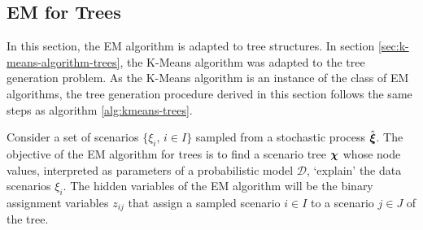 \subsection{EM for Trees}
\label{sec:mixt-gauss-trees}
In this section, the EM algorithm is adapted to tree structures.
In section \ref{sec:k-means-algorithm-trees}, the K-Means algorithm was adapted to the tree generation problem.
As the K-Means algorithm is an instance of the class of EM algorithms, the tree generation procedure derived in this section follows the same steps as algorithm \ref{alg:kmeans-trees}.

Consider a set of scenarios $\{\xi_i,\, i\in I\}$ sampled from a stochastic process $\hat{\boldsymbol\xi}$.
The objective of the EM algorithm for trees is to find a scenario tree $\boldsymbol\chi$ whose node values, interpreted as parameters of a probabilistic model $\mathcal{D}$, `explain' the data scenarios $\xi_i$.
The hidden variables of the EM algorithm will be the binary assignment variables $z_{ij}$ that assign a sampled scenario $i\in I$ to a scenario $j\in J$ of the tree.

